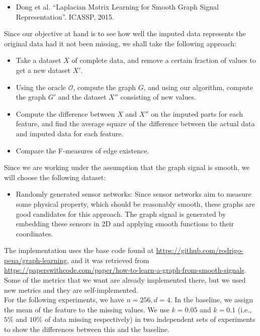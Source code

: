 \documentclass[a4paper]{article}
\newcommand{\nl}{\vspace{0.2cm}\\}
\newcommand{\mc}{\mathcal}
\begin{document}
\begin{itemize}
    \item Dong et al. ``Laplacian Matrix Learning for Smooth Graph Signal Representation''. ICASSP, 2015.
\end{itemize}

Since our objective at hand is to see how well the imputed data represents the original data had it not been missing, we shall take the following approach:
\begin{itemize}
    \item Take a dataset $X$ of complete data, and remove a certain fraction of values to get a new dataset $X'$.
    \item Using the oracle $\mc{O}$, compute the graph $G$, and using our algorithm, compute the graph $G'$ and the dataset $X''$ consisting of new values.
    \item Compute the difference between $X$ and $X''$ on the imputed parts for each feature, and find the average square of the difference between the actual data and imputed data for each
        feature.
    \item Compare the F-measures of edge existence.
\end{itemize}

Since we are working under the assumption that the graph signal is smooth, we will choose the following dataset:

\begin{itemize}
    \item Randomly generated sensor networks: Since sensor networks aim to measure some physical property, which should be reasonably smooth, these graphs are good candidates for this approach.
        The graph signal is generated by embedding these sensors in 2D and applying smooth functions to their coordinates.
\end{itemize}

The implementation uses the base code found at \href{https://github.com/rodrigo-pena/graph-learning}{https://github.com/rodrigo-pena/graph-learning}, and it was retrieved from
\href{https://paperswithcode.com/paper/how-to-learn-a-graph-from-smooth-signals}{https://paperswithcode.com/paper/how-to-learn-a-graph-from-smooth-signals}. Some of the metrics that we
want are already implemented there, but we used new metrics and they are self-implemented.\nl

For the following experiments, we have $n = 256, d = 4$. In the baseline, we assign the mean of the feature to the missing values. We use $k = 0.05$ and $k = 0.1$ (i.e., $5\%$ and $10\%$ of data
missing respectively) in two independent sets of experiments to show the differences between this and the baseline.
\end{document}
